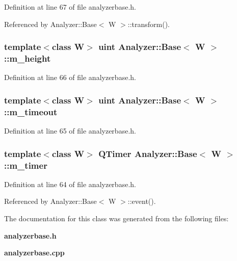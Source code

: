 Definition at line 67 of file analyzerbase.h.

Referenced by Analyzer::Base$<$ W $>$::transform().
\subsubsection{\setlength{\rightskip}{0pt plus 5cm}template$<$class W$>$ uint {\bf Analyzer::Base}$<$ W $>$::{\bf m\_\-height}\hspace{0.3cm}{\tt  [protected]}}\label{classAnalyzer_1_1Base_Analyzer_1_1Basep2}




Definition at line 66 of file analyzerbase.h.
\subsubsection{\setlength{\rightskip}{0pt plus 5cm}template$<$class W$>$ uint {\bf Analyzer::Base}$<$ W $>$::{\bf m\_\-timeout}\hspace{0.3cm}{\tt  [protected]}}\label{classAnalyzer_1_1Base_Analyzer_1_1Basep1}




Definition at line 65 of file analyzerbase.h.
\subsubsection{\setlength{\rightskip}{0pt plus 5cm}template$<$class W$>$ QTimer {\bf Analyzer::Base}$<$ W $>$::{\bf m\_\-timer}\hspace{0.3cm}{\tt  [protected]}}\label{classAnalyzer_1_1Base_Analyzer_1_1Basep0}




Definition at line 64 of file analyzerbase.h.

Referenced by Analyzer::Base$<$ W $>$::event().

The documentation for this class was generated from the following files:\begin{CompactItemize}
\item 
{\bf analyzerbase.h}\item 
{\bf analyzerbase.cpp}\end{CompactItemize}
